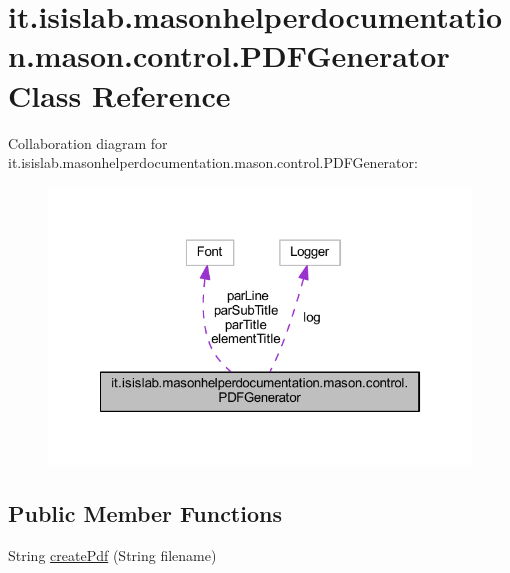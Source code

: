 \hypertarget{classit_1_1isislab_1_1masonhelperdocumentation_1_1mason_1_1control_1_1_p_d_f_generator}{\section{it.\-isislab.\-masonhelperdocumentation.\-mason.\-control.\-P\-D\-F\-Generator Class Reference}
\label{classit_1_1isislab_1_1masonhelperdocumentation_1_1mason_1_1control_1_1_p_d_f_generator}
}


Collaboration diagram for it.\-isislab.\-masonhelperdocumentation.\-mason.\-control.\-P\-D\-F\-Generator\-:
\nopagebreak
\begin{figure}[H]
\begin{center}
\leavevmode
\includegraphics[width=322pt]{classit_1_1isislab_1_1masonhelperdocumentation_1_1mason_1_1control_1_1_p_d_f_generator__coll__graph}
\end{center}
\end{figure}
\subsection*{Public Member Functions}
\begin{DoxyCompactItemize}
\item 
String \hyperlink{classit_1_1isislab_1_1masonhelperdocumentation_1_1mason_1_1control_1_1_p_d_f_generator_af54a565ca57780023cc3ac7a386a6dbb}{create\-Pdf} (String filename)
\end{DoxyCompactItemize}
